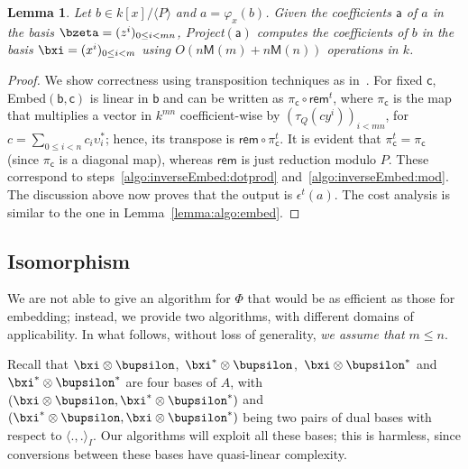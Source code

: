 \documentclass{sig-alternate}
\def\M {\ensuremath{\mathsf{M}}}
\def\va {\ensuremath{\mathsf{a}}}
\def\vb {\ensuremath{\mathsf{b}}}
\def\vc {\ensuremath{\mathsf{c}}}
\def\rem {\ensuremath{\mathsf{rem}}}
\newcounter{algo}
\newcommand{\ang}[1]{\langle#1\rangle}
\newtheorem{Lemma}{Lemma}
\begin{document}
\begin{Lemma}\label{lemma:project}
  Let $b \in k[x]/\ang{P}$ and $a=\varphi_x(b)$. Given the
  coefficients $\va$ of $a$ in the basis $\bzeta=(z^i)_{0 \le i
    < mn}$, {\sf Project}$(\va)$ computes the coefficients of $b$ in
  the basis $\bxi=(x^i)_{0 \le i < m}$ using $O(n\M(m) + n\M(n))$
  operations in $k$.
\end{Lemma}
\begin{proof}
  We show correctness using transposition techniques as
  in~\cite{bostan+lecerf+schost:tellegen}. For fixed $\vc$,
  {\sf Embed}$(\vb,\vc)$ is linear in $\vb$ and can be written as
  $\pi_\vc\circ\rem^t$, where $\pi_\vc$ is the map that multiplies a
  vector in $k^{mn}$ coefficient-wise by $(\tau_Q(c y^i))_{i<mn}$, for
  $c=\sum_{0 \le i < n} c_i \upsilon^\ast_i$; hence, its transpose is
  $\rem\circ\pi_\vc^t$. It is evident that $\pi_\vc^t=\pi_\vc$ (since
  $\pi_\vc$ is a diagonal map), whereas $\rem$ is just reduction
  modulo $P$. These correspond to
  steps~\ref{algo:inverseEmbed:dotprod}
  and~\ref{algo:inverseEmbed:mod}. The discussion above now proves
  that the output is $\epsilon^t(a)$. The cost analysis is similar to
  the one in Lemma~\ref{lemma:algo:embed}.
\end{proof}


\subsection{Isomorphism} 

We are not able to give an algorithm for $\Phi$ that would be as
efficient as those for embedding; instead, we provide two algorithms,
with different domains of applicability. In what follows, without
loss of generality, {\em we assume that $m\le n$}.

Recall that $\bxi \otimes \bupsilon$,\ $\bxi^\ast \otimes
\bupsilon$,\ $\bxi \otimes \bupsilon^\ast$ and $\bxi^\ast \otimes
\bupsilon^\ast$ are four bases of $A$, with $(\bxi \otimes \bupsilon,
\bxi^\ast \otimes \bupsilon^\ast)$ and $(\bxi^\ast \otimes \bupsilon,
\bxi \otimes \bupsilon^\ast)$ being two pairs of dual bases with
respect to $\ang{.,.}_I$. Our algorithms will exploit all these bases;
this is harmless, since conversions between these bases have
quasi-linear complexity.
\end{document}
